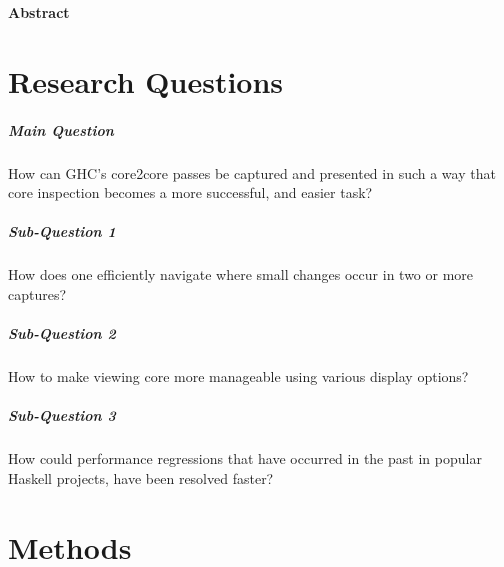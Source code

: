 \documentclass{report}
\begin{document}
\vspace*{\fill}
\begin{center}
\begin{minipage}{.7\textwidth}
\centerline{\textbf{Abstract}}

\end{minipage}
\end{center}
\vfill %

\thispagestyle{empty}

\newpage
\clearpage
{}
\tableofcontents

\newpage
\clearpage
{}

\newpage




\chapter{Research Questions}


\paragraph{Main Question} 
How can GHC’s core2core passes be captured and presented in such a way that core
inspection becomes a more successful, and easier task?

\hfill \break

\paragraph{Sub-Question 1} 
How does one efficiently navigate where small changes occur in two or more captures?

\paragraph{Sub-Question 2}
How to make viewing core more manageable using various display options?

\paragraph{Sub-Question 3}
How could performance regressions that have occurred in the past in popular Haskell projects,
have been resolved faster?


\newpage


\chapter{Methods}
\end{document}
